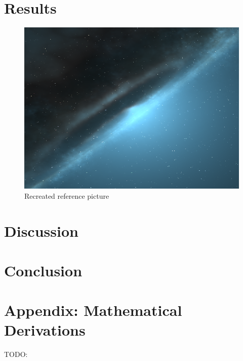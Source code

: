 \documentclass[reprint,english,notitlepage]{revtex4-2}
\begin{document}
\section{Results} \label{sec:results}

\begin{figure}[h!]
	\centering
	\includegraphics[scale = .2]{Figures/sample0000.png}
	\caption{Recreated reference picture}
	\label{fig: ref picture}
  \end{figure}
  

\section{Discussion} \label{sec:discussion}



\section{Conclusion} \label{sec:conclusion}



\section{Appendix: Mathematical Derivations}


\newpage
\newpage
TODO: %
\end{document}
